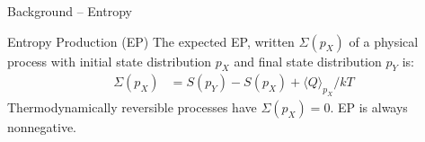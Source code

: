 \begin{frame}{Background -- Entropy}
    \begin{block}{Entropy Production (EP)}
    The expected EP, written $\Sigma (p_X)$ of a physical process with initial state distribution $p_X$ and final state distribution $p_Y$ is:
    \begin{align*}
        \Sigma (p_X) &= S(p_Y) - S(p_X) + \langle Q \rangle_{p_X}/kT
    \end{align*}
    Thermodynamically reversible processes have $\Sigma (p_X)=0$. EP is always nonnegative.
    \end{block}
\end{frame}


